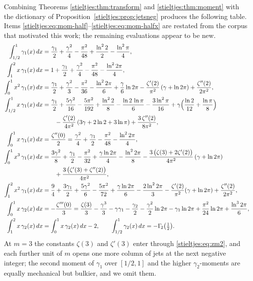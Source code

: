 Combining Theorems \ref{stieltjes:thm:transform} and \ref{stieltjes:thm:moment} with the
dictionary of Proposition~\ref{stieltjes:prop:jetsneg} produces the following table.
Items \eqref{stieltjes:eq:mom-half}--\eqref{stieltjes:eq:mom-halfx} are restated from the
corpus that motivated this work; the remaining evaluations appear to be
new.
\begin{align}
\int_{1/2}^{1}\gamma_1(x)\,dx
&=\frac{\gamma_1}{2}+\frac{\gamma^2}{4}-\frac{\pi^2}{48}
+\frac{\ln^2 2}{2}-\frac{\ln^2\pi}{4},
\label{stieltjes:eq:mom-half}\\
\int_{1}^{2}x\,\gamma_1(x)\,dx
&=1+\frac{\gamma_1}{2}+\frac{\gamma^2}{4}-\frac{\pi^2}{48}
-\frac{\ln^2 2\pi}{4},
\label{stieltjes:eq:mom-12x}\\
\int_{0}^{1}x^2\,\gamma_1(x)\,dx
&=\frac{\gamma_1}{2}+\frac{\gamma^2}{3}-\frac{\pi^2}{36}
-\frac{\ln^2 2\pi}{6}+\frac{\gamma}{6}\ln 2\pi
-\frac{\zeta'(2)}{\pi^2}\,(\gamma+\ln 2\pi)+\frac{\zeta''(2)}{2\pi^2},
\label{stieltjes:eq:mom-sq}\\
\int_{1/2}^{1}x\,\gamma_1(x)\,dx
&=\frac{\gamma_1}{2}+\frac{5\gamma^2}{16}-\frac{5\pi^2}{192}
+\frac{\ln^2 2}{8}-\frac{\ln 2\,\ln\pi}{6}-\frac{3\ln^2\pi}{16}
+\gamma\Bigl(\frac{\ln 2}{12}+\frac{\ln\pi}{8}\Bigr)\notag\\
&\qquad
-\frac{\zeta'(2)}{4\pi^2}\,(3\gamma+2\ln 2+3\ln\pi)
+\frac{3\,\zeta''(2)}{8\pi^2},
\label{stieltjes:eq:mom-halfx}\\[2pt]
\int_{0}^{1}x\,\gamma_1(x)\,dx
&=\frac{\zeta''(0)}{2}
=\frac{\gamma^2}{4}+\frac{\gamma_1}{2}-\frac{\pi^2}{48}-\frac{\ln^2 2\pi}{4},
\label{stieltjes:eq:mom-x}\\
\int_{0}^{1}x^3\,\gamma_1(x)\,dx
&=\frac{3\gamma^2}{8}+\frac{\gamma_1}{2}-\frac{\pi^2}{32}
+\frac{\gamma\ln2\pi}{4}-\frac{\ln^2 2\pi}{8}
-\frac{3\,\bigl(\zeta(3)+2\zeta'(2)\bigr)}{4\pi^2}\,(\gamma+\ln2\pi)\notag\\
&\qquad+\frac{3\,\bigl(\zeta'(3)+\zeta''(2)\bigr)}{4\pi^2},
\label{stieltjes:eq:mom-x3}\\
\int_{1}^{2}x^2\,\gamma_1(x)\,dx
&=\frac94+\frac{3\gamma_1}{2}+\frac{5\gamma^2}{6}-\frac{5\pi^2}{72}
+\frac{\gamma\ln2\pi}{6}-\frac{2\ln^2 2\pi}{3}
-\frac{\zeta'(2)}{\pi^2}(\gamma+\ln2\pi)+\frac{\zeta''(2)}{2\pi^2},
\label{stieltjes:eq:mom-12x2}\\[2pt]
\int_{0}^{1}x\,\gamma_2(x)\,dx
&=-\frac{\zeta'''(0)}{3}
=\frac{\zeta(3)}{3}-\frac{\gamma^3}{3}-\gamma\gamma_1-\frac{\gamma_2}{2}
-\frac{\gamma^2}{2}\ln2\pi-\gamma_1\ln2\pi
+\frac{\pi^2}{24}\ln2\pi+\frac{\ln^3 2\pi}{6},
\label{stieltjes:eq:mom-g2}\\
\int_{1}^{2}x\,\gamma_2(x)\,dx
&=\int_{0}^{1}x\,\gamma_2(x)\,dx-2,
\qquad
\int_{1/2}^{1}\gamma_2(x)\,dx=-\Gamma_{\!2}\bigl(\tfrac12\bigr) .
\label{stieltjes:eq:mom-g2b}
\end{align}
At $m=3$ the constants $\zeta(3)$ and $\zeta'(3)$ enter through
\eqref{stieltjes:eq:zm2}, and each further unit of $m$ opens one more column of jets
at the next negative integer; the second moment of $\gamma_1$ over
$[1/2,1]$ and the higher $\gamma_2$-moments are equally mechanical but
bulkier, and we omit them.

